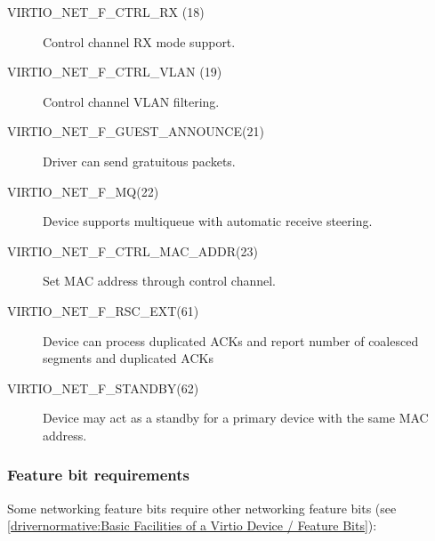 \begin{description}
\item[VIRTIO_NET_F_CTRL_RX (18)] Control channel RX mode support.

\item[VIRTIO_NET_F_CTRL_VLAN (19)] Control channel VLAN filtering.

\item[VIRTIO_NET_F_GUEST_ANNOUNCE(21)] Driver can send gratuitous
    packets.

\item[VIRTIO_NET_F_MQ(22)] Device supports multiqueue with automatic
    receive steering.

\item[VIRTIO_NET_F_CTRL_MAC_ADDR(23)] Set MAC address through control
    channel.

\item[VIRTIO_NET_F_RSC_EXT(61)] Device can process duplicated ACKs
    and report number of coalesced segments and duplicated ACKs

\item[VIRTIO_NET_F_STANDBY(62)] Device may act as a standby for a primary
    device with the same MAC address.
\end{description}

\subsubsection{Feature bit requirements}\label{sec:Device Types / Network Device / Feature bits / Feature bit requirements}

Some networking feature bits require other networking feature bits
(see \ref{drivernormative:Basic Facilities of a Virtio Device / Feature Bits}):

